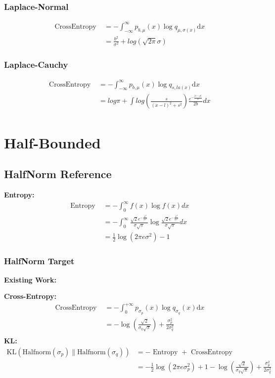 \documentclass{article}
\begin{document}
\subsubsection{Laplace-Normal}
$$ \begin{aligned} \text { CrossEntropy }&=
-\int_{-\infty}^{\infty} p_{b,\mu}(x) \log q_{\mu, \sigma(x)} \mathrm{d} x \\
&=\frac{b^{2}}{\sigma^{2}}+log(\sqrt{2\pi}\sigma) 
\end{aligned}
 $$
\subsubsection{Laplace-Cauchy}
$$ \begin{aligned} \text { CrossEntropy }&=
-\int_{-\infty}^{\infty} p_{b,\mu}(x) \log q_{s, la(x)} \mathrm{d} x \\
&=log\pi+ \int log(\frac{s}{(x-l)^{2}+s^{2}} )\frac{e^{-\frac{\left | x-\mu \right | }{b} } }{2b} dx \\
\end{aligned}
 $$
 
\section{Half-Bounded}
\subsection{HalfNorm Reference}

\noindent \textbf{Entropy:}
$$ \begin{aligned} \text { Entropy }&=-\int_{0}^{\infty} f(x) \log f(x) d x\\&=-\int_{0}^{\infty}\frac{\sqrt{2}e^{-\frac{x^{2} }{2\sigma^{2}}}}{\sigma\sqrt{\pi}}\log\frac{\sqrt{2}e^{-\frac{x^{2} }{2\sigma^{2}}}}{\sigma\sqrt{\pi}} d x\\&=\frac{1}{2} \log\left(2 \pi e \sigma^{2}\right)-1
\end{aligned} $$

\subsubsection{HalfNorm Target}

\noindent \textbf{Existing Work:}

\noindent \textbf{Cross-Entropy:}
$$ \begin{aligned} \text { CrossEntropy }&=-\int_{0}^{+\infty} p_{\sigma_{p}}(x) \log q_{\sigma_{q}}(x) \mathrm{d} x \\&=
-\log(\frac{\sqrt{2}}{\sigma_{q}\sqrt{\pi}} )+\frac{\sigma_{p}^{2}}{2\sigma_{q}^{2}} \\
\end{aligned} $$
\noindent \textbf{KL:}
$$ \begin{aligned}\mathrm{KL}\left(\mathrm{Halfnorm}\left(\sigma_{p}\right) \| \mathrm{Halfnorm}\left(\sigma_{q}\right)\right)&=-\text { Entropy }+\text{ CrossEntropy }\\&=
- \frac{1}{2} \log\left(2 \pi e \sigma_{p}^{2}\right)+1 -\log(\frac{\sqrt{2}}{\sigma_{q}\sqrt{\pi}} )+\frac{\sigma_{p}^{2}}{2\sigma_{q}^{2}} \\
\end{aligned} $$
\end{document}
